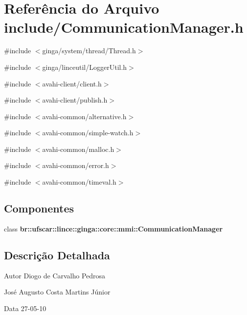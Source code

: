 \section{Referência do Arquivo include/CommunicationManager.h}
\label{CommunicationManager_8h}
{\ttfamily \#include $<$ginga/system/thread/Thread.h$>$}\par
{\ttfamily \#include $<$ginga/linceutil/LoggerUtil.h$>$}\par
{\ttfamily \#include $<$avahi-\/client/client.h$>$}\par
{\ttfamily \#include $<$avahi-\/client/publish.h$>$}\par
{\ttfamily \#include $<$avahi-\/common/alternative.h$>$}\par
{\ttfamily \#include $<$avahi-\/common/simple-\/watch.h$>$}\par
{\ttfamily \#include $<$avahi-\/common/malloc.h$>$}\par
{\ttfamily \#include $<$avahi-\/common/error.h$>$}\par
{\ttfamily \#include $<$avahi-\/common/timeval.h$>$}\par
\subsection*{Componentes}
\begin{DoxyCompactItemize}
\item 
class {\bf br::ufscar::lince::ginga::core::mmi::CommunicationManager}
\end{DoxyCompactItemize}


\subsection{Descrição Detalhada}
\begin{DoxyAuthor}{Autor}
Diogo de Carvalho Pedrosa 

José Augusto Costa Martins Júnior 
\end{DoxyAuthor}
\begin{DoxyDate}{Data}
27-\/05-\/10 
\end{DoxyDate}
